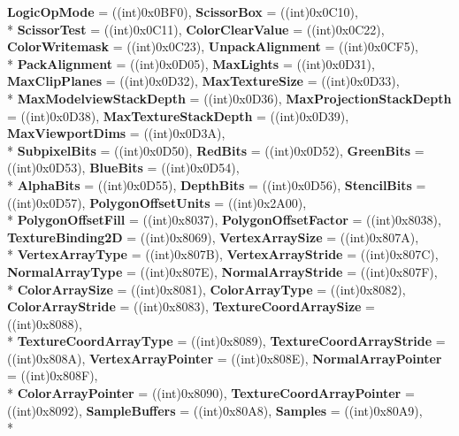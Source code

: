 \begin{DoxyCompactItemize}
{\bfseries Logic\-Op\-Mode} = ((int)0x0\-B\-F0), 
{\bfseries Scissor\-Box} = ((int)0x0\-C10), 
\\*
{\bfseries Scissor\-Test} = ((int)0x0\-C11), 
{\bfseries Color\-Clear\-Value} = ((int)0x0\-C22), 
{\bfseries Color\-Writemask} = ((int)0x0\-C23), 
{\bfseries Unpack\-Alignment} = ((int)0x0\-C\-F5), 
\\*
{\bfseries Pack\-Alignment} = ((int)0x0\-D05), 
{\bfseries Max\-Lights} = ((int)0x0\-D31), 
{\bfseries Max\-Clip\-Planes} = ((int)0x0\-D32), 
{\bfseries Max\-Texture\-Size} = ((int)0x0\-D33), 
\\*
{\bfseries Max\-Modelview\-Stack\-Depth} = ((int)0x0\-D36), 
{\bfseries Max\-Projection\-Stack\-Depth} = ((int)0x0\-D38), 
{\bfseries Max\-Texture\-Stack\-Depth} = ((int)0x0\-D39), 
{\bfseries Max\-Viewport\-Dims} = ((int)0x0\-D3\-A), 
\\*
{\bfseries Subpixel\-Bits} = ((int)0x0\-D50), 
{\bfseries Red\-Bits} = ((int)0x0\-D52), 
{\bfseries Green\-Bits} = ((int)0x0\-D53), 
{\bfseries Blue\-Bits} = ((int)0x0\-D54), 
\\*
{\bfseries Alpha\-Bits} = ((int)0x0\-D55), 
{\bfseries Depth\-Bits} = ((int)0x0\-D56), 
{\bfseries Stencil\-Bits} = ((int)0x0\-D57), 
{\bfseries Polygon\-Offset\-Units} = ((int)0x2\-A00), 
\\*
{\bfseries Polygon\-Offset\-Fill} = ((int)0x8037), 
{\bfseries Polygon\-Offset\-Factor} = ((int)0x8038), 
{\bfseries Texture\-Binding2\-D} = ((int)0x8069), 
{\bfseries Vertex\-Array\-Size} = ((int)0x807\-A), 
\\*
{\bfseries Vertex\-Array\-Type} = ((int)0x807\-B), 
{\bfseries Vertex\-Array\-Stride} = ((int)0x807\-C), 
{\bfseries Normal\-Array\-Type} = ((int)0x807\-E), 
{\bfseries Normal\-Array\-Stride} = ((int)0x807\-F), 
\\*
{\bfseries Color\-Array\-Size} = ((int)0x8081), 
{\bfseries Color\-Array\-Type} = ((int)0x8082), 
{\bfseries Color\-Array\-Stride} = ((int)0x8083), 
{\bfseries Texture\-Coord\-Array\-Size} = ((int)0x8088), 
\\*
{\bfseries Texture\-Coord\-Array\-Type} = ((int)0x8089), 
{\bfseries Texture\-Coord\-Array\-Stride} = ((int)0x808\-A), 
{\bfseries Vertex\-Array\-Pointer} = ((int)0x808\-E), 
{\bfseries Normal\-Array\-Pointer} = ((int)0x808\-F), 
\\*
{\bfseries Color\-Array\-Pointer} = ((int)0x8090), 
{\bfseries Texture\-Coord\-Array\-Pointer} = ((int)0x8092), 
{\bfseries Sample\-Buffers} = ((int)0x80\-A8), 
{\bfseries Samples} = ((int)0x80\-A9), 
\\*

\end{DoxyCompactItemize}

